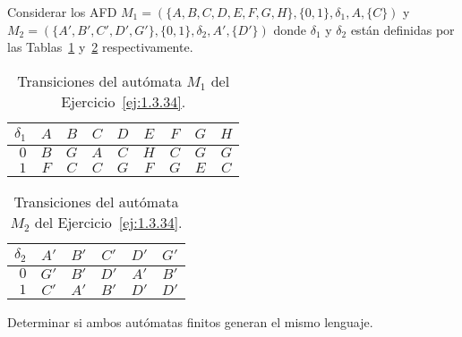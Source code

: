 \begin{ejercicio}\label{ej:1.3.34}
    Considerar los AFD $M_1=(\{A,B,C,D,E,F,G,H\}, \{0,1\}, \delta_1, A, \{C\})$ y $M_2=(\{A',B',C',D',G'\}, \{0,1\}, \delta_2, A', \{D'\})$ donde $\delta_1$ y $\delta_2$ están definidas por las Tablas~\ref{tab:1.3.34-M1} y~\ref{tab:1.3.34-M2} respectivamente.
    \begin{table}
        \centering
        \begin{tabular}{r|cccccccc}
            $\delta_1$ & $A$ & $B$ & $C$ & $D$ & $E$ & $F$ & $G$ & $H$ \\
            \hline
            $0$ & $B$ & $G$ & $A$ & $C$ & $H$ & $C$ & $G$ & $G$ \\
            $1$ & $F$ & $C$ & $C$ & $G$ & $F$ & $G$ & $E$ & $C$
        \end{tabular}
        \caption{Transiciones del autómata $M_1$ del Ejercicio~\ref{ej:1.3.34}.}
        \label{tab:1.3.34-M1}
    \end{table}
    \begin{table}
        \centering
        \begin{tabular}{r|ccccc}
            $\delta_2$ & $A'$ & $B'$ & $C'$ & $D'$ & $G'$ \\
            \hline
            $0$ & $G'$ & $B'$ & $D'$ & $A'$ & $B'$ \\
            $1$ & $C'$ & $A'$ & $B'$ & $D'$ & $D'$
        \end{tabular}
        \caption{Transiciones del autómata $M_2$ del Ejercicio~\ref{ej:1.3.34}.}
        \label{tab:1.3.34-M2}
    \end{table}
    Determinar si ambos autómatas finitos generan el mismo lenguaje.\\


\end{ejercicio}
